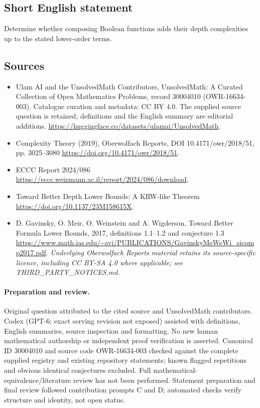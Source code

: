 \documentclass[11pt]{article}
\begin{document}
\subsection{Short English statement}
Determine whether composing Boolean functions adds their depth complexities up to the stated lower-order terms.
\subsection{Sources}
\begin{itemize}
\item[\hypertarget{source:30004010:1}{S1}] Ulam AI and the UnsolvedMath Contributors, UnsolvedMath: A Curated Collection of Open Mathematics Problems, record 30004010 (OWR-16634-003). Catalogue curation and metadata: CC BY 4.0. The supplied source question is retained; definitions and the English summary are editorial additions.
\url{https://huggingface.co/datasets/ulamai/UnsolvedMath}.
\item[\hypertarget{source:30004010:2}{S2}] Complexity Theory (2019), Oberwolfach Reports, DOI 10.4171/owr/2018/51, pp. 3025--3080
\url{https://doi.org/10.4171/owr/2018/51}.
\item[\hypertarget{source:30004010:3}{S3}] ECCC Report 2024/086
\url{https://eccc.weizmann.ac.il/report/2024/086/download}.
\item[\hypertarget{source:30004010:4}{S4}] Toward Better Depth Lower Bounds: A KRW-like Theorem
\url{https://doi.org/10.1137/23M158615X}.
\item[\hypertarget{source:30004010:5}{S5}] D. Gavinsky, O. Meir, O. Weinstein and A. Wigderson, Toward Better Formula Lower Bounds, 2017, definitions 1.1--1.2 and conjecture 1.3
\url{https://www.math.ias.edu/~avi/PUBLICATIONS/GavinskyMeWeWi_sicomp2017.pdf}.
\textit{Underlying Oberwolfach Reports material retains its source-specific licence, including CC BY-SA 4.0 where applicable; see THIRD\_PARTY\_NOTICES.md.}
\end{itemize}
\paragraph{Preparation and review.}
Original question attributed to the cited source and UnsolvedMath contributors. Codex (GPT-6; exact serving revision not exposed) assisted with definitions, English summaries, source inspection and formatting. No new human mathematical authorship or independent proof verification is asserted. Canonical ID 30004010 and source code OWR-16634-003 checked against the complete supplied registry and existing repository statements; known flagged repetitions and obvious identical conjectures excluded. Full mathematical-equivalence/literature review has not been performed. Statement preparation and final review followed contribution prompts C and D; automated checks verify structure and identity, not open status.
\label{end:30004010}
\end{document}
